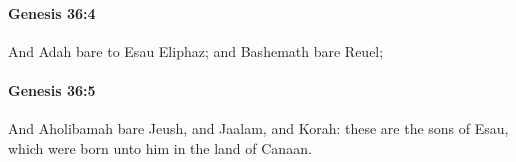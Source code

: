 		\paragraph{Genesis 36:4} %
			\label{GENESIS-36-4}

			And Adah bare to Esau Eliphaz; and Bashemath bare Reuel;


		\paragraph{Genesis 36:5} %
			\label{GENESIS-36-5}

			And Aholibamah bare Jeush, and Jaalam, and Korah: these are the sons of Esau, which were born unto him in the land of Canaan.


